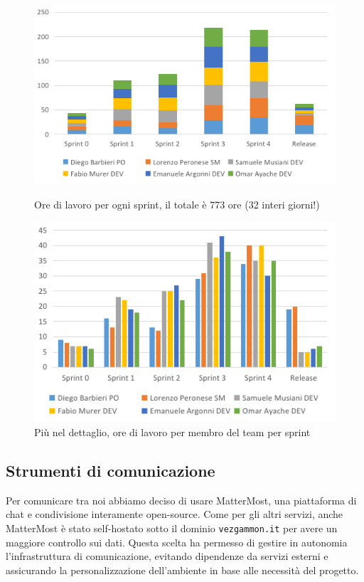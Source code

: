 \documentclass{article}
\begin{document}
\begin{figure}[H]
    \centering
    \begin{minipage}[t]{0.52\textwidth}
        \centering
        \includegraphics[width=\textwidth]{report-logging_sprints}
        \caption{Ore di lavoro per ogni sprint, il totale è 773 ore (32 interi giorni!)}
        \label{fig:logging-sprints}
    \end{minipage}
    \hfill
    \begin{minipage}[t]{0.47\textwidth}
        \centering
        \includegraphics[width=\textwidth]{report-logging_full}
        \caption{Più nel dettaglio, ore di lavoro per membro del team per sprint}
        \label{fig:logging-full}
    \end{minipage}    
\end{figure}



\subsection{Strumenti di comunicazione} \label{sec:mm}
Per comunicare tra noi abbiamo deciso di usare MatterMost, una piattaforma di chat e condivisione interamente open-source. Come per gli altri 
servizi, anche MatterMost è stato self-hostato sotto il dominio \texttt{vezgammon.it} per avere un maggiore controllo sui dati. Questa scelta ha permesso 
di gestire in autonomia l'infrastruttura di comunicazione, evitando dipendenze da servizi esterni e assicurando la personalizzazione 
dell'ambiente in base alle necessità del progetto.
\end{document}

